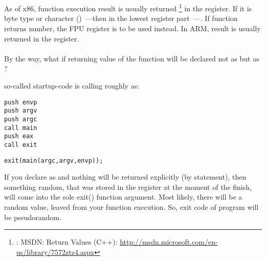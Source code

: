 \chapter{}


{As of x86, function execution result is usually returned}
\footnote{\Seealso: 
MSDN: Return Values (C++): \url{http://msdn.microsoft.com/en-us/library/7572ztz4.aspx}}
{in the \EAX register. 
If it is byte type or character (\Tchar)~---then in the lowest register \EAX part~---\AL. 
If function returns \Tfloat number, the FPU register 
\STZERO is to be used instead.
In ARM, result is usually returned in the  register.} \\
\\

{By the way, what if returning value of the \main function will be declared not as \Tint but as \Tvoid?}

{so-called startup-code is calling \main roughly as:}

\begin{lstlisting}
push envp
push argv
push argc
call main
push eax
call exit
\end{lstlisting}


\begin{lstlisting}
exit(main(argc,argv,envp));
\end{lstlisting}

{If you declare \main as \Tvoid and nothing will be returned explicitly (by  statement),
then something random, that was stored in the \EAX register at the moment of the \main finish, will come into
the sole exit() function argument.}
{Most likely, there will be a random value, leaved from your function execution.}
{So, exit code of program will be pseudorandom.} \\

